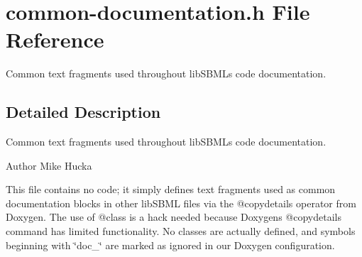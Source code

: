 \hypertarget{common-documentation_8h}{}\section{common-\/documentation.h File Reference}
\label{common-documentation_8h}


Common text fragments used throughout lib\+S\+B\+ML\textquotesingle{}s code documentation.  




\subsection{Detailed Description}
Common text fragments used throughout lib\+S\+B\+ML\textquotesingle{}s code documentation. 

\begin{DoxyAuthor}{Author}
Mike Hucka
\end{DoxyAuthor}
This file contains no code; it simply defines text fragments used as common documentation blocks in other lib\+S\+B\+ML files via the @copydetails operator from Doxygen. The use of @class is a hack needed because Doxygen\textquotesingle{}s @copydetails command has limited functionality. No classes are actually defined, and symbols beginning with \char`\"{}doc\+\_\+\char`\"{} are marked as ignored in our Doxygen configuration. 
